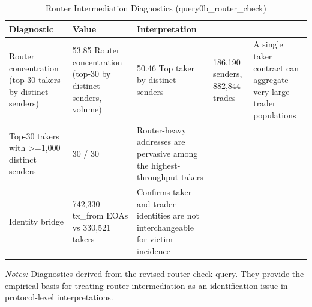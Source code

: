 \begin{table}[htbp]
\centering
\caption{Router Intermediation Diagnostics (query0b_router_check)}
\label{tab:router_intermediation}
\begin{tabular}{lll}
\toprule
Diagnostic & Value & Interpretation \\
\midrule
Router concentration (top-30 takers by distinct senders) & 53.85%
Router concentration (top-30 by distinct senders, volume) & 50.46%
Top taker by distinct senders & 186,190 senders, 882,844 trades & A single taker contract can aggregate very large trader populations \\
Top-30 takers with >=1,000 distinct senders & 30 / 30 & Router-heavy addresses are pervasive among the highest-throughput takers \\
Identity bridge & 742,330 tx_from EOAs vs 330,521 takers & Confirms taker and trader identities are not interchangeable for victim incidence \\
\bottomrule
\end{tabular}
\vspace{0.2cm}
\begin{minipage}{\linewidth}
\small
\textit{Notes:} Diagnostics derived from the revised router check query. They provide the empirical basis for treating router intermediation as an identification issue in protocol-level interpretations.
\end{minipage}
\end{table}
